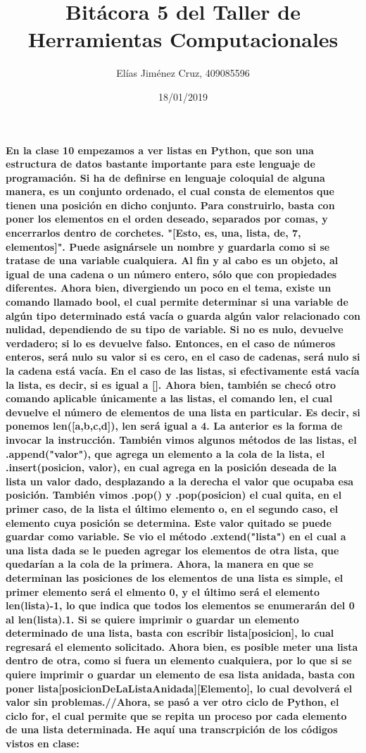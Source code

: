 \documentclass[letterpaper, 12pt, oneside]{article} %
\title{\Huge Bitácora 5 del Taller de Herramientas Computacionales}
\author{Elías Jiménez Cruz, 409085596}
\date{18/01/2019}
\begin{document}
	\maketitle
	\paragraph{En la clase 10 empezamos a ver listas en Python, que son una estructura de datos bastante importante para este lenguaje de programación. Si ha de definirse en lenguaje coloquial de alguna manera, es un conjunto ordenado, el cual consta de elementos que tienen una posición en dicho conjunto. Para construirlo, basta con poner los elementos en el orden deseado, separados por comas, y encerrarlos dentro de corchetes. "[Esto, es, una, lista, de, 7, elementos]". Puede asignársele un nombre y guardarla como si se tratase de una variable cualquiera. Al fin y al cabo es un objeto, al igual de una cadena o un número entero, sólo que con propiedades diferentes. Ahora bien, divergiendo un poco en el tema, existe un comando llamado bool, el cual permite determinar si una variable de algún tipo determinado está vacía o guarda algún valor relacionado con nulidad, dependiendo de su tipo de variable. Si no es nulo, devuelve verdadero; si lo es devuelve falso. Entonces, en el caso de números enteros, será nulo su valor si es cero, en el caso de cadenas, será nulo si la cadena está vacía. En el caso de las listas, si efectivamente está vacía la lista, es decir, si es igual a []. Ahora bien, también se checó otro comando aplicable únicamente a las listas, el comando len, el cual devuelve el número de elementos de una lista en particular. Es decir, si ponemos len([a,b,c,d]), len será igual a 4. La anterior es la forma de invocar la instrucción. También vimos algunos métodos de las listas, el .append("valor"), que agrega un elemento a la cola de la lista, el .insert(posicion, valor), en cual agrega en la posición deseada de la lista un valor dado, desplazando a la derecha el valor que ocupaba esa posición. También vimos .pop() y .pop(posicion) el cual quita, en el primer caso, de la lista el último elemento o, en el segundo caso, el elemento cuya posición se determina. Este valor quitado se puede guardar como variable. Se vio el método .extend("lista") en el cual a una lista dada se le pueden agregar los elementos de otra lista, que quedarían a la cola de la primera. Ahora, la manera en que se determinan las posiciones de los elementos de una lista es simple, el primer elemento será el elmento 0, y el último será el elemento len(lista)-1, lo que indica que todos los elementos se enumerarán del 0 al len(lista).1. Si se quiere imprimir o guardar un elemento determinado de una lista, basta con escribir lista[posicion], lo cual regresará el elemento solicitado. Ahora bien, es posible meter una lista dentro de otra, como si fuera un elemento cualquiera, por lo que si se quiere imprimir o guardar un elemento de esa lista anidada, basta con poner lista[posicionDeLaListaAnidada][Elemento], lo cual devolverá el valor sin problemas.//Ahora, se pasó a ver otro ciclo de Python, el ciclo for, el cual permite que se repita un proceso por cada elemento de una lista determinada. He aquí una transcrpición de los códigos vistos en clase:}
\end{document}
